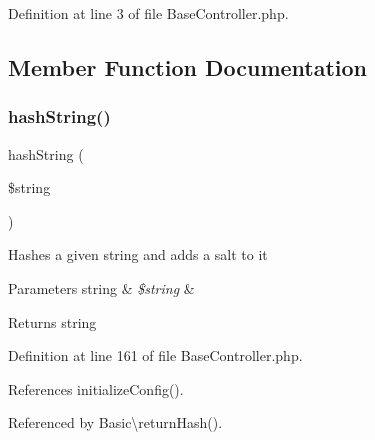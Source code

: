 Definition at line 3 of file Base\+Controller.\+php.



\subsection{Member Function Documentation}
\hypertarget{class_base_controller_ac7f37d2e13bade1709f5c88b02f0e9d1}{}\label{class_base_controller_ac7f37d2e13bade1709f5c88b02f0e9d1} 
\subsubsection{\texorpdfstring{hash\+String()}{hashString()}}
{\footnotesize\ttfamily hash\+String (\begin{DoxyParamCaption}\item[{}]{\$string }\end{DoxyParamCaption})\hspace{0.3cm}{\ttfamily [protected]}}

Hashes a given string and adds a salt to it


\begin{DoxyParams}[1]{Parameters}
string & {\em \$string} & \\
\hline
\end{DoxyParams}
\begin{DoxyReturn}{Returns}
string 
\end{DoxyReturn}


Definition at line 161 of file Base\+Controller.\+php.



References initialize\+Config().



Referenced by Basic\textbackslash{}return\+Hash().


\hypertarget{class_base_controller_a5fa8890bd3a9d20f5c0cc2377dc49eb1}{}\label{class_base_controller_a5fa8890bd3a9d20f5c0cc2377dc49eb1} 
